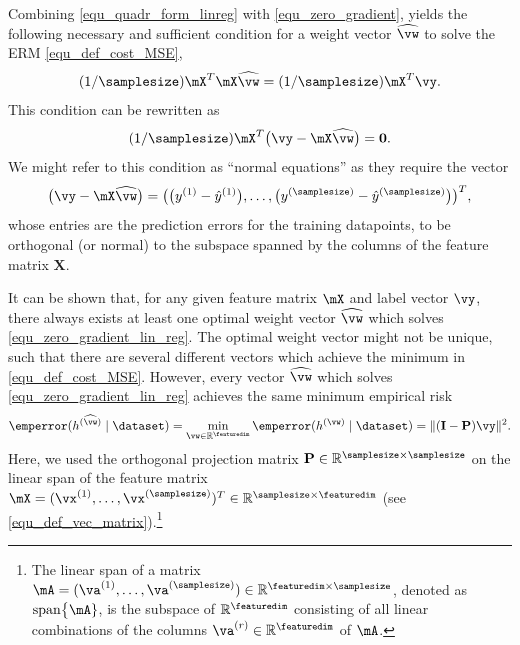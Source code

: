\documentclass[12pt]{report}
\begin{document}
Combining \eqref{equ_quadr_form_linreg} with \eqref{equ_zero_gradient}, 
yields the following necessary and sufficient condition for a weight vector 
$\widehat{\vw}$ to solve the ERM \eqref{equ_def_cost_MSE},
\begin{equation}
\label{equ_zero_gradient_lin_reg}
(1/\samplesize) \mX^{T} \mX\widehat{\vw} = (1/\samplesize) \mX^{T} \vy.  
\end{equation} 
This condition can be rewritten as 
\begin{equation}
\label{equ_zero_gradient_lin_reg_normal_condition}
(1/\samplesize) \mX^{T} \big( \vy - \mX \widehat{\vw} \big) = \mathbf{0}.  
\end{equation} 
We might refer to this condition as ``normal equations'' as they 
require the vector $$\big( \vy - \mX\widehat{\vw}\big) = \big(\big(y^{(1)}-\hat{y}^{(1)}\big),\ldots,\big(y^{(\samplesize)}-\hat{y}^{(\samplesize)}\big)  \big)^{T},$$
whose entries are the prediction errors for the training datapoints, to 
be orthogonal (or normal) to the subspace spanned by the columns 
of the feature matrix $\mathbf{X}$. 


It can be shown that, for any given feature matrix $\mX$ and label vector $\vy$, there always 
exists at least one optimal weight vector $\widehat{\vw}$ which solves \eqref{equ_zero_gradient_lin_reg}. 
The optimal weight vector might not be unique, such that there are several different vectors 
which achieve the minimum in \eqref{equ_def_cost_MSE}. However, 
every vector $\widehat{\vw}$ which solves \eqref{equ_zero_gradient_lin_reg} 
achieves the same minimum empirical risk 
\begin{equation}
\label{equ_emp_risk_lin_proje}
\emperror(h^{(\widehat{\vw})} \mid \dataset) = \min_{\vw \in \mathbb{R}^{\featuredim}} \emperror(h^{(\vw)} \mid \dataset) = \|  (\mathbf{I}- \mathbf{P}) \vy \|^{2}.
\end{equation} 
Here, we used the orthogonal projection matrix $\mathbf{P} \in \mathbb{R}^{\samplesize \times \samplesize}$ 
on the linear span of the feature matrix $\mX = (\vx^{(1)},\ldots,\vx^{(\samplesize)})^{T} \in \mathbb{R}^{\samplesize \times \featuredim}$ (see \eqref{equ_def_vec_matrix}).\footnote{The linear span of a matrix $\mA=(\va^{(1)},\ldots,\va^{(\samplesize)}) \in \mathbb{R}^{\featuredim \times \samplesize}$, denoted as ${\rm span } \big\{\mA\}$, is the subspace 
	of $\mathbb{R}^{\featuredim}$ consisting of all linear combinations 
of the columns $\va^{(r)} \in \mathbb{R}^{\featuredim}$ of $\mA$.} 
\end{document}
